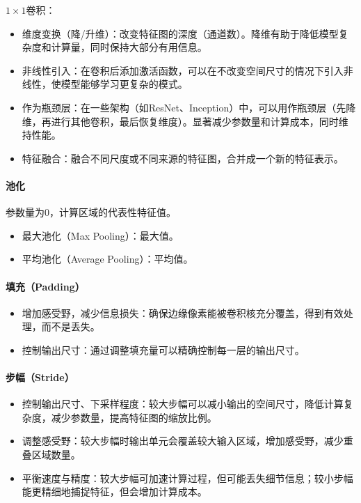 \documentclass[
12pt, %
a4paper, 
oneside, %
headinclude,footinclude, %
]{scrartcl}
\begin{document}
$ 1 \times 1 $卷积：
\begin{itemize}
\item 维度变换（降/升维）：改变特征图的深度（通道数）。降维有助于降低模型复杂度和计算量，同时保持大部分有用信息。
\item 非线性引入：在卷积后添加激活函数，可以在不改变空间尺寸的情况下引入非线性，使模型能够学习更复杂的模式。
\item 作为瓶颈层：在一些架构（如ResNet、Inception）中，可以用作瓶颈层（先降维，再进行其他卷积，最后恢复维度）。显著减少参数量和计算成本，同时维持性能。
\item 特征融合：融合不同尺度或不同来源的特征图，合并成一个新的特征表示。
\end{itemize}
\paragraph{池化}
参数量为$ 0 $，计算区域的代表性特征值。
\begin{itemize}
\item 最大池化（Max Pooling）：最大值。
\item 平均池化（Average Pooling）：平均值。
\end{itemize}
\paragraph{填充（Padding）}
\begin{itemize}
\item 增加感受野，减少信息损失：确保边缘像素能被卷积核充分覆盖，得到有效处理，而不是丢失。
\item 控制输出尺寸：通过调整填充量可以精确控制每一层的输出尺寸。
\end{itemize}
\paragraph{步幅（Stride）}
\begin{itemize}
\item 控制输出尺寸、下采样程度：较大步幅可以减小输出的空间尺寸，降低计算复杂度，减少参数量，提高特征图的缩放比例。
\item 调整感受野：较大步幅时输出单元会覆盖较大输入区域，增加感受野，减少重叠区域数量。
\item 平衡速度与精度：较大步幅可加速计算过程，但可能丢失细节信息；较小步幅能更精细地捕捉特征，但会增加计算成本。
\end{itemize}
\end{document}
